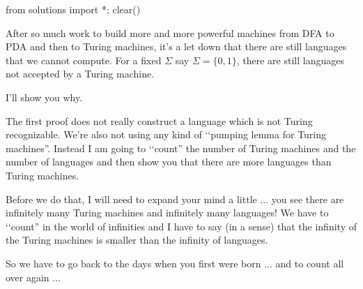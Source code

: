 \begin{python0}
from solutions import *; clear()
\end{python0}

After so much work to build more and more powerful machines from DFA to PDA and then to Turing machines,
it's a let down that there are still languages that we cannot compute.
For a fixed $\Sigma$ say $\Sigma = \{0, 1\}$, there are still languages
not accepted by a Turing machine.

I'll show you why.

The first proof does not really construct a language which is not 
Turing recognizable.
We're also not using any kind of \lq\lq pumping lemma for Turing machines''.
Instead I am going to \lq\lq count'' the number of Turing machines
and the number of languages and then show you that there are more languages
than Turing machines.

Before we do that, I will need to expand your mind a little ... you 
see there are infinitely many Turing machines and infinitely many
languages!
We have to \lq\lq count'' in the world of infinities and I have to say
(in a sense) that the infinity of the Turing machines is smaller than
the infinity of languages.

So we have to go back to the days when you first were born ...
and to count all over again ...

